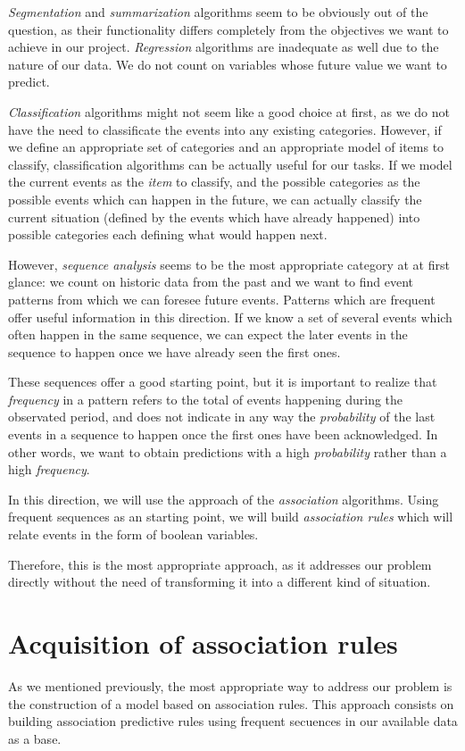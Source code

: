 \emph{Segmentation} and \emph{summarization} algorithms seem to be obviously out of the question, as their functionality differs completely from the objectives we want to achieve in our project. \emph{Regression} algorithms are inadequate as well due to the nature of our data. We do not count on variables whose future value we want to predict.

\emph{Classification} algorithms might not seem like a good choice at first, as we do not have the need to classificate the events into any existing categories. However, if we define an appropriate set of categories and an appropriate model of items to classify, classification algorithms can be actually useful for our tasks. If we model the current events as the \emph{item} to classify, and the possible categories as the possible events which can happen in the future, we can actually classify the current situation (defined by the events which have already happened) into possible categories each defining what would happen next.

However, \emph{sequence analysis} seems to be the most appropriate category at at first glance: we count on historic data from the past and we want to find event patterns from which we can foresee future events. Patterns which are frequent offer useful information in this direction. If we know a set of several events which often happen in the same sequence, we can expect the later events in the sequence to happen once we have already seen the first ones.

These sequences offer a good starting point, but it is important to realize that \emph{frequency} in a pattern refers to the total of events happening during the observated period, and does not indicate in any way the \emph{probability} of the last events in a sequence to happen once the first ones have been acknowledged. In other words, we want to obtain predictions with a high \emph{probability} rather than a high \emph{frequency}.

In this direction, we will use the approach of the \emph{association} algorithms. Using frequent sequences as an starting point, we will build \emph{association rules} which will relate events in the form of boolean variables.

Therefore, this is the most appropriate approach, as it addresses our problem directly without the need of transforming it into a different kind of situation.

\section{Acquisition of association rules}
\label{sec:rule_model}
As we mentioned previously, the most appropriate way to address our problem is the construction of a model based on association rules. This approach consists on building association predictive rules using frequent secuences in our available data as a base.

